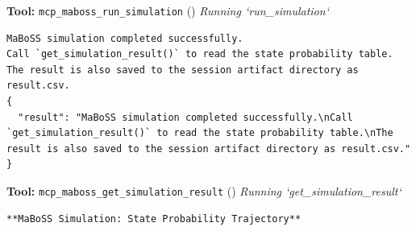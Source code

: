 \documentclass[11pt,a4paper]{article}
\begin{document}
\begin{toolokbox}
\textbf{Tool:} \texttt{mcp\_maboss\_run\_simulation} (\checkmark)
\textit{Running `run\_simulation`}
\begin{lstlisting}
MaBoSS simulation completed successfully.
Call `get_simulation_result()` to read the state probability table.
The result is also saved to the session artifact directory as result.csv.
{
  "result": "MaBoSS simulation completed successfully.\nCall `get_simulation_result()` to read the state probability table.\nThe result is also saved to the session artifact directory as result.csv."
}
\end{lstlisting}
\end{toolokbox}
\begin{toolokbox}
\textbf{Tool:} \texttt{mcp\_maboss\_get\_simulation\_result} (\checkmark)
\textit{Running `get\_simulation\_result`}
\begin{lstlisting}
**MaBoSS Simulation: State Probability Trajectory**


\end{lstlisting}
\end{toolokbox}
\end{document}
